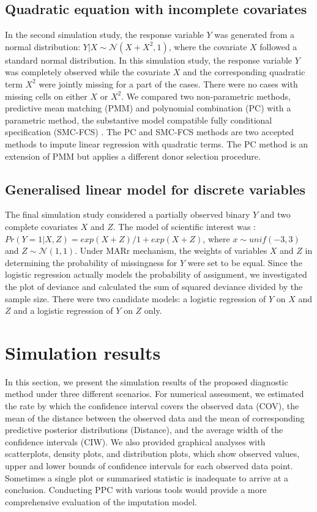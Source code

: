 	\subsection{Quadratic equation with incomplete covariates}
	In the second simulation study, the response variable $Y$ was generated from a normal distribution: $Y|X \sim \mathcal{N}(X + X^2, 1)$, where the covariate $X$ followed a standard normal distribution. In this simulation study, the response variable $Y$ was completely observed while the covariate $X$ and the corresponding quadratic term $X^2$ were jointly missing for a part of the cases. There were no cases with missing cells on either $X$ or $X^2$. We compared two non-parametric methods, predictive mean matching (PMM) and polynomial combination (PC) with a parametric method, the substantive model compatible fully conditional specification (SMC-FCS) \citep{Vink2013, bartlett2015multiple}. The PC and SMC-FCS methods are two accepted methods to impute linear regression with quadratic terms. The PC method is an extension of PMM but applies a different donor selection procedure. 
	
	\subsection{Generalised linear model for discrete variables}
	The final simulation study considered a partially observed binary $Y$ and two complete covariates $X$ and $Z$. The model of scientific interest was : $Pr (Y = 1 | X, Z) = exp(X + Z) / 1 + exp(X + Z)$,
	where $x \sim unif(-3 , 3)$ and $Z \sim \mathcal{N}(1, 1)$. Under MARr mechanism, the weights of variables $X$ and $Z$ in determining the probability of missingness for $Y$ were set to be equal. Since the logistic regression actually models the probability of assignment, we investigated the plot of deviance and calculated the sum of squared deviance divided by the sample size. There were two candidate models: a logistic regression of $Y$ on $X$ and $Z$ and a logistic regression of $Y$ on $Z$ only.
	
	\section{Simulation results}
	\label{sec:6.5}
	In this section, we present the simulation results of the proposed diagnostic method under three different scenarios. For numerical assessment, we estimated the rate by which the confidence interval covers the observed data (COV), the mean of the distance between the observed data and the mean of corresponding predictive posterior distributions (Distance), and the average width of the confidence intervals (CIW). We also provided graphical analyses with scatterplots, density plots, and distribution plots, which show observed values, upper and lower bounds of confidence intervals for each observed data point. Sometimes a single plot or summarised statistic is inadequate to arrive at a conclusion. Conducting PPC with various tools would provide a more comprehensive evaluation of the imputation model.     
	
